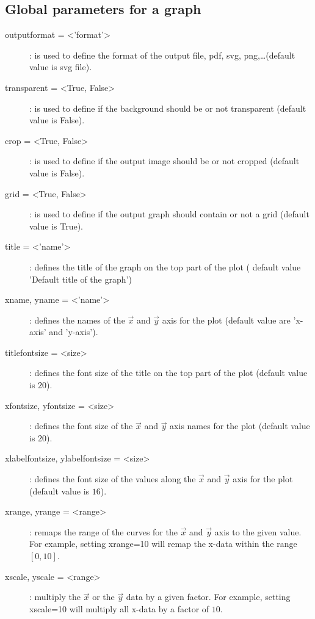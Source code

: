 \subsection{Global parameters for a graph}
\begin{description}
\item [outputformat = <'format'>]: is used to define the format of the output file, \ie pdf, svg, png,\ldots (default value is svg file).
\item [transparent = <True, False>]: is used to define if the background should be or not transparent (default value is False).
\item [crop = <True, False>]: is used to define if the output image should be or not cropped (default value is False).
\item [grid = <True, False>]: is used to define if the output graph should contain or not a grid (default value is True).
\item [title = <'name'>]: defines the title of the graph on the top part of the plot ( default value 'Default title of the graph')
\item [xname, yname = <'name'>]: defines the names of the $\overrightarrow{x}$ and $\overrightarrow{y}$ axis for the plot (default value are 'x-axis' and 'y-axis').
\item [titlefontsize = <size>]: defines the font size of the title on the top part of the plot (default value is $20$).
\item [xfontsize, yfontsize = <size>]: defines the font size of the $\overrightarrow{x}$ and $\overrightarrow{y}$ axis names for the plot (default value is $20$).
\item [xlabelfontsize, ylabelfontsize = <size>]: defines the font size of the values along the $\overrightarrow{x}$ and $\overrightarrow{y}$ axis for the plot (default value is $16$).
\item [xrange, yrange = <range>]: remaps the range of the curves for the $\overrightarrow{x}$ and $\overrightarrow{y}$ axis to the given value. For example, setting \textsf{xrange=10} will remap the x-data within the range $[0,10]$.
\item [xscale, yscale = <range>]: multiply the $\overrightarrow{x}$ or the $\overrightarrow{y}$ data by a given factor. For example, setting \textsf{xscale=10} will multiply all x-data by a factor of $10$.
\end{description}

